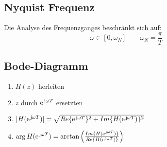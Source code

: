 \subsection{Nyquist Frequenz}
Die Analyse des Frequenzganges beschränkt sich auf:
\[
	\omega \in [0,\omega_N] \qquad \omega_N = \frac{\pi}{T}
\]

\subsection{Bode-Diagramm}
\begin{enumerate}
	\item $H(z)$ herleiten
	\item $z$ durch $\e^{\im\omega T}$ ersetzten
	\item $|H(\e^{\im\omega T})| = \sqrt{Re\{\e^{\im\omega T}\}^2+Im\{H(\e^{\im\omega T})\}^2}$
	\item $\arg H(\e^{\im\omega T}) = \arctan \left(\frac{Im\{H(\e^{\im\omega T})\}}{Re\{H(\e^{\im\omega T})\}}\right)$
\end{enumerate}